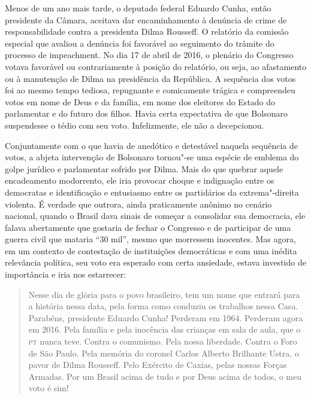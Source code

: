 Menos de um ano mais tarde, o deputado federal Eduardo Cunha, então
presidente da Câmara, aceitava dar encaminhamento à denúncia de crime de
responsabilidade contra a presidenta Dilma Rousseff. O relatório da
comissão especial que avaliou a denúncia foi favorável ao seguimento do
trâmite do processo de impeachment. No dia 17 de abril de 2016, o
plenário do Congresso votava favorável ou contrariamente à posição do
relatório, ou seja, ao afastamento ou à manutenção de Dilma na
presidência da República. A sequência dos votos foi ao mesmo tempo
tediosa, repugnante e comicamente trágica e compreendeu votos em nome de
Deus e da família, em nome dos eleitores do Estado do parlamentar e do
futuro dos filhos. Havia certa expectativa de que Bolsonaro suspendesse
o tédio com seu voto. Infelizmente, ele não a decepcionou.

Conjuntamente com o que havia de anedótico e detestável naquela
sequência de votos, a abjeta intervenção de Bolsonaro tornou"-se uma
espécie de emblema do golpe jurídico e parlamentar sofrido por Dilma.
Mais do que quebrar aquele encadeamento modorrento, ele iria provocar
choque e indignação entre os democratas e identificação e entusiasmo
entre os partidários da extrema"-direita violenta. É verdade que outrora,
ainda praticamente anônimo no cenário nacional, quando o Brasil dava
sinais de começar a consolidar sua democracia, ele falava abertamente
que gostaria de fechar o Congresso e de participar de uma guerra civil
que mataria ``30 mil'', mesmo que morressem inocentes. Mas agora, em um
contexto de contestação de instituições democráticas e com uma inédita
relevância política, seu voto era esperado com certa ansiedade, estava
investido de importância e iria nos estarrecer:

\begin{quote}
Nesse dia de glória para o povo brasileiro, tem um nome que entrará para
a história nessa data, pela forma como conduziu os trabalhos nessa Casa.
Parabéns, presidente Eduardo Cunha! Perderam em 1964. Perderam agora em
2016. Pela família e pela inocência das crianças em sala de aula, que o
\textsc{pt} nunca teve. Contra o comunismo. Pela nossa liberdade. Contra o Foro
de São Paulo. Pela memória do coronel Carlos Alberto Brilhante Ustra, o
pavor de Dilma Rousseff. Pelo Exército de Caxias, pelas nossas Forças
Armadas. Por um Brasil acima de tudo e por Deus acima de todos, o meu
voto é sim!
\end{quote}

